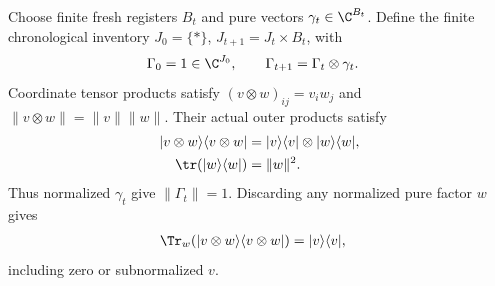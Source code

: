 \begin{definition}
    \label{def:construction_inventory}
    \leanok
    Choose finite fresh registers $B_t$ and pure vectors
    $\gamma_t\in\C^{B_t}$. Define the finite chronological inventory
    $J_0=\{*\}$, $J_{t+1}=J_t\times B_t$, with
    \begin{align}
        \Gamma_0 & =1\in\C^{J_0},
        \qquad \Gamma_{t+1}=\Gamma_t\otimes\gamma_t.
        \label{eq:construction_inventory_vector}
    \end{align}
    Coordinate tensor products satisfy
    $(v\otimes w)_{ij}=v_iw_j$ and
    $\lVert v\otimes w\rVert=\lVert v\rVert\lVert w\rVert$.
    Their actual outer products satisfy
    \begin{align}
        |v\otimes w\rangle\langle v\otimes w|
                                 & =|v\rangle\langle v|\otimes|w\rangle\langle w|,
        \label{eq:construction_tensor_density}                                     \\
        \tr(|w\rangle\langle w|) & =\lVert w\rVert^2.
        \label{eq:construction_pure_trace}
    \end{align}
    Thus normalized $\gamma_t$ give $\lVert\Gamma_t\rVert=1$.
    Discarding any normalized pure factor $w$ gives
    \begin{align}
        \Tr_w(|v\otimes w\rangle\langle v\otimes w|)
         & =|v\rangle\langle v|,
        \label{eq:construction_pure_discard}
    \end{align}
    including zero or subnormalized $v$.
\end{definition}


